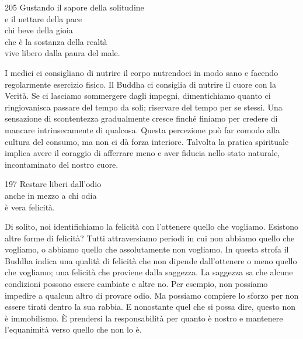 
\begin{dhpVerse}{205}
\label{dhp-205}
Gustando il sapore della solitudine\\
e il nettare della pace\\
chi beve della gioia\\
che è la sostanza della realtà\\
vive libero dalla paura del male.
\end{dhpVerse}

\begin{dhpRefl}
  I medici ci consigliano di nutrire il corpo nutrendoci in modo sano e facendo
  regolarmente esercizio fisico. Il Buddha ci consiglia di nutrire il cuore con
  la Verità. Se ci lasciamo sommergere dagli impegni, dimentichiamo quanto ci
  ringiovanisca passare del tempo da soli; riservare del tempo per se stessi.
  Una sensazione di scontentezza gradualmente cresce finché finiamo per credere
  di mancare intrinsecamente di qualcosa. Questa percezione può far comodo alla
  cultura del consumo, ma non ci dà forza interiore. Talvolta la pratica
  spirituale implica avere il coraggio di afferrare meno e aver fiducia nello
  stato naturale, incontaminato del nostro cuore.
\end{dhpRefl}


\begin{dhpVerse}{197}
\label{dhp-197}
Restare liberi dall'odio\\
anche in mezzo a chi odia\\
è vera felicità.
\end{dhpVerse}

\begin{dhpRefl}
  Di solito, noi identifichiamo la felicità con l'ottenere quello che vogliamo.
  Esistono altre forme di felicità? Tutti attraversiamo periodi in cui non
  abbiamo quello che vogliamo, o abbiamo quello che assolutamente non vogliamo.
  In questa strofa il Buddha indica una qualità di felicità che non dipende
  dall'ottenere o meno quello che vogliamo; una felicità che proviene dalla
  saggezza. La saggezza sa che alcune condizioni possono essere cambiate e altre
  no. Per esempio, non possiamo impedire a qualcun altro di provare odio. Ma
  possiamo compiere lo sforzo per non essere tirati dentro la sua rabbia. E
  nonostante quel che si possa dire, questo non è immobilismo. È prendersi la
  responsabilità per quanto è nostro e mantenere l'equanimità verso quello che
  non lo è.
\end{dhpRefl}

